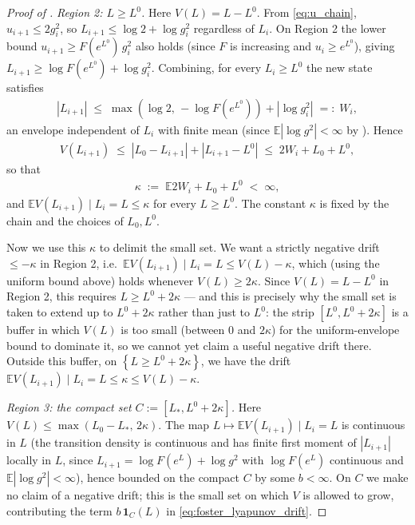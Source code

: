 \documentclass[10pt,a4paper]{amsart}
\newcommand{\Abs}[1]{\left| #1 \right|}
\newcommand{\Brack}[1]{\left( #1 \right)}
\newcommand{\Exp}[1]{\mathbb{E} #1}
\newcommand{\Set}[1]{\left\{ #1 \right\}}
\newcommand{\cond}{\mid}
\begin{document}
\begin{proof}[Proof of ]
  \emph{Region 2: $L \ge L^0$.} Here $V(L) = L - L^0$. From \eqref{eq:u_chain}, $u_{i+1} \le 2 g_i^2$, so $L_{i+1} \le \log 2 + \log g_i^2$ regardless of $L_i$. On Region 2 the lower bound $u_{i+1} \ge F(e^{L^0})\, g_i^2$ also holds (since $F$ is increasing and $u_i \ge e^{L^0}$), giving $L_{i+1} \ge \log F(e^{L^0}) + \log g_i^2$. Combining, for every $L_i \ge L^0$ the new state satisfies
  \begin{eqnarray*}
    \Abs{L_{i+1}} \;\le\; \max\!\Brack{\log 2,\, -\log F(e^{L^0})} + \Abs{\log g_i^2}
    \;=:\; W_i,
  \end{eqnarray*}
  an envelope independent of $L_i$ with finite mean (since $\Exp{|\log g^2|} < \infty$ by ). Hence
  \begin{eqnarray*}
    V(L_{i+1}) \;\le\; \Abs{L_0 - L_{i+1}} + \Abs{L_{i+1} - L^0} \;\le\; 2 W_i + L_0 + L^0,
  \end{eqnarray*}
  so that
  \begin{eqnarray*}
    \kappa \;:=\; \Exp{2 W_i + L_0 + L^0} \;<\; \infty,
  \end{eqnarray*}
  and $\Exp{V(L_{i+1}) \cond L_i = L} \le \kappa$ for every $L \ge L^0$. The constant $\kappa$ is fixed by the chain and the choices of $L_0, L^0$.

  Now we use this $\kappa$ to delimit the small set. We want a strictly negative drift $\le -\kappa$ in Region 2, i.e.\ $\Exp{V(L_{i+1}) \cond L_i = L} \le V(L) - \kappa$, which (using the uniform bound above) holds whenever $V(L) \ge 2\kappa$. Since $V(L) = L - L^0$ in Region 2, this requires $L \ge L^0 + 2\kappa$ --- and this is precisely why the small set is taken to extend up to $L^0 + 2\kappa$ rather than just to $L^0$: the strip $[L^0, L^0 + 2\kappa]$ is a buffer in which $V(L)$ is too small (between $0$ and $2\kappa$) for the uniform-envelope bound to dominate it, so we cannot yet claim a useful negative drift there. Outside this buffer, on $\Set{L \ge L^0 + 2\kappa}$, we have the drift $\Exp{V(L_{i+1}) \cond L_i = L} \le \kappa \le V(L) - \kappa$.

  \emph{Region 3: the compact set $C := [L_*, L^0 + 2\kappa]$.} Here $V(L) \le \max(L_0 - L_*,\, 2\kappa)$. The map $L \mapsto \Exp{V(L_{i+1}) \cond L_i = L}$ is continuous in $L$ (the transition density is continuous and has finite first moment of $|L_{i+1}|$ locally in $L$, since $L_{i+1} = \log F(e^L) + \log g^2$ with $\log F(e^L)$ continuous and $\Exp{|\log g^2|} < \infty$), hence bounded on the compact $C$ by some $b < \infty$. On $C$ we make no claim of a negative drift; this is the small set on which $V$ is allowed to grow, contributing the term $b\,\mathbf{1}_C(L)$ in \eqref{eq:foster_lyapunov_drift}.


\end{proof}
\end{document}
